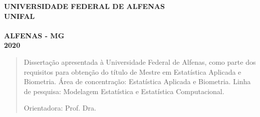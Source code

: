 
\setcounter{page}{0}

	
\onehalfspacing
\thispagestyle{empty}
\begin{center}
	\Large{\textbf{UNIVERSIDADE FEDERAL DE ALFENAS \\
			UNIFAL}}\\
	\vspace{4cm}
    \Large{\textbf{\teseauthorcap}}\\
	\vspace{5cm}
    \Large{\textbf{\tesetitlecap}} 
	\vfill
	\textbf{ALFENAS - MG\\
		2020}
\end{center}



\newpage
\vspace{-0.7cm}
\centerline{\textbf{\teseauthorcap}}
\vspace{3cm}
\begin{singlespace}
\begin{center}
\textbf{\tesetitlecap}
\end{center}
\end{singlespace}
\vspace{3cm}
\begin{flushright}
\begin{minipage}{10cm}
\begin{quote}
\begin{singlespace}
Dissertação apresentada à Universidade Federal de Alfenas, como parte dos requisitos para obtenção do título de Mestre em Estatística Aplicada e Biometria. Área de concentração: Estatística Aplicada e Biometria. Linha de pesquisa: Modelagem Estatística e Estatística Computacional. 

\vspace{0.1cm}
\noindent Orientadora: Prof. Dra. \teseorientador
\end{singlespace}
\end{quote}
\end{minipage}
\end{flushright}


